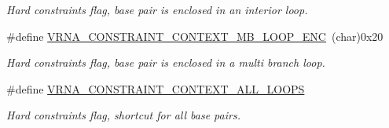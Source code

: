\begin{DoxyCompactItemize}
\begin{DoxyCompactList}\small\item\em Hard constraints flag, base pair is enclosed in an interior loop. \end{DoxyCompactList}\item 
\#define \hyperlink{group__hard__constraints_ga02a3d703ddbcfce393e4bbfcb9db7077}{V\+R\+N\+A\+\_\+\+C\+O\+N\+S\+T\+R\+A\+I\+N\+T\+\_\+\+C\+O\+N\+T\+E\+X\+T\+\_\+\+M\+B\+\_\+\+L\+O\+O\+P\+\_\+\+E\+NC}~(char)0x20\hypertarget{group__hard__constraints_ga02a3d703ddbcfce393e4bbfcb9db7077}{}\label{group__hard__constraints_ga02a3d703ddbcfce393e4bbfcb9db7077}

\begin{DoxyCompactList}\small\item\em Hard constraints flag, base pair is enclosed in a multi branch loop. \end{DoxyCompactList}\item 
\#define \hyperlink{group__hard__constraints_ga886d9127c49bb982a4b67cd7581e8a5a}{V\+R\+N\+A\+\_\+\+C\+O\+N\+S\+T\+R\+A\+I\+N\+T\+\_\+\+C\+O\+N\+T\+E\+X\+T\+\_\+\+A\+L\+L\+\_\+\+L\+O\+O\+PS}\hypertarget{group__hard__constraints_ga886d9127c49bb982a4b67cd7581e8a5a}{}\label{group__hard__constraints_ga886d9127c49bb982a4b67cd7581e8a5a}

\begin{DoxyCompactList}\small\item\em Hard constraints flag, shortcut for all base pairs. \end{DoxyCompactList}\end{DoxyCompactItemize}
